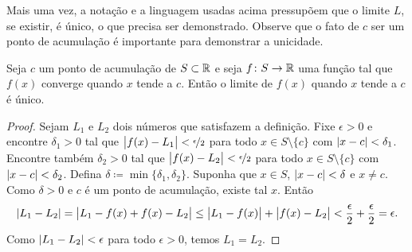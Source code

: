 Mais uma vez, a notação e a linguagem usadas acima pressupõem que o limite $L$, se
existir, é único, o que precisa ser demonstrado. Observe que o fato de $c$
ser um ponto de acumulação é importante para demonstrar a unicidade.

\begin{prop}
Seja $c$ um ponto de acumulação de $S \subset {\mathbb{R}}$ e seja $f \colon S \to {\mathbb{R}}$
uma função tal que $f(x)$ converge quando $x$ tende a $c$. Então
o limite de $f(x)$ quando $x$ tende a $c$ é único.
\end{prop}

\begin{proof}
Sejam $L_1$ e $L_2$ dois números que satisfazem a definição.
Fixe $\epsilon > 0$ e encontre $\delta_1 > 0$ tal que
$\bigl\lvert {f(x)-L_1} \bigr\rvert < \nicefrac{\epsilon}{2}$
para todo $x \in S \setminus \{c\}$ com $\lvert {x-c} \rvert < \delta_1$.
Encontre também $\delta_2 > 0$ tal que
$\bigl\lvert {f(x)-L_2} \bigr\rvert < \nicefrac{\epsilon}{2}$
para todo $x \in S \setminus \{c\}$ com $\lvert {x-c} \rvert < \delta_2$.
Defina $\delta \coloneqq \min \{ \delta_1, \delta_2 \}$. Suponha que $x \in S$,
$\lvert {x-c} \rvert < \delta$ e $x \neq c$. Como $\delta > 0$ e $c$ é um ponto de acumulação,
existe tal $x$. Então
\begin{equation*}
\lvert {L_1 - L_2} \rvert =
\bigl\lvert {L_1 - f(x) + f(x) - L_2} \bigr\rvert \leq
\bigl\lvert {L_1 - f(x)} \bigr\rvert + \bigl\lvert {f(x) - L_2} \bigr\rvert < \frac{\epsilon}{2} + \frac{\epsilon}{2}
= \epsilon.
\end{equation*}
Como $\lvert {L_1-L_2} \rvert < \epsilon$ para todo $\epsilon > 0$, temos
$L_1 = L_2$.
\end{proof}

